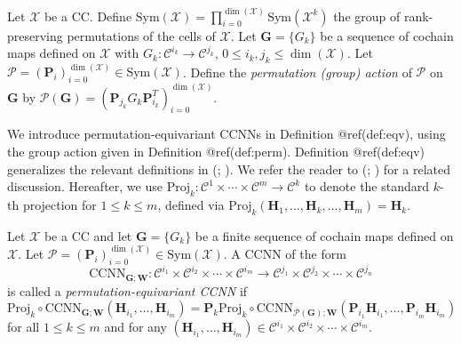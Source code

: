 \documentclass[
  12pt,
]{krantz}
\begin{document}
\label{perm}
Let \(\mathcal{X}\) be a CC. Define
\(\mbox{Sym}(\mathcal{X}) = \prod_{i=0}^{\dim(\mathcal{X})} \mbox{Sym}(\mathcal{X}^k)\)
the group of rank-preserving permutations of the cells of
\(\mathcal{X}\). Let \(\mathbf{G}=\{G_k\}\) be a sequence of cochain
maps defined on \(\mathcal{X}\) with
\(G_k  \colon \mathcal{C}^{i_k}\to \mathcal{C}^{j_k}\),
\(0\leq i_k,j_k\leq \dim(\mathcal{X})\). Let
\(\mathcal{P}=(\mathbf{P}_i)_{i=0}^{\dim(\mathcal{X})} \in \mbox{Sym}(\mathcal{X})\).
Define the \emph{permutation (group) action} of \(\mathcal{P}\) on
\(\mathbf{G}\) by
\(\mathcal{P}(\mathbf{G}) = (\mathbf{P}_{j_k} G_{k} \mathbf{P}_{i_k}^T )_{i=0}^{\dim(\mathcal{X})}\).

We introduce permutation-equivariant CCNNs in Definition @ref(def:eqv),
using the group action given in Definition @ref(def:perm). Definition
@ref(def:eqv) generalizes the relevant definitions in
(; ). We refer the reader to (;
) for a related
discussion. Hereafter, we use
\(\mbox{Proj}_k \colon \mathcal{C}^1\times \cdots \times \mathcal{C}^m \to \mathcal{C}^k\)
to denote the standard \(k\)-th projection for \(1\leq k \leq m\),
defined via
\(\mbox{Proj}_k ( \mathbf{H}_{1},\ldots, \mathbf{H}_{k},\ldots,\mathbf{H}_{m})= \mathbf{H}_{k}\).

\label{eqv}
Let \(\mathcal{X}\) be a CC and let \(\mathbf{G}= \{G_k\}\) be a finite
sequence of cochain maps defined on \(\mathcal{X}\). Let
\(\mathcal{P}=(\mathbf{P}_i)_{i=0}^{\dim(\mathcal{X})} \in \mbox{Sym}(\mathcal{X})\).
A CCNN of the form \begin{equation*}
\mbox{CCNN}_{\mathbf{G};\mathbf{W}}\colon \mathcal{C}^{i_1}\times\mathcal{C}^{i_2}\times \cdots \times  \mathcal{C}^{i_m} \to \mathcal{C}^{j_1}\times\mathcal{C}^{j_2}\times \cdots \times \mathcal{C}^{j_n}
\end{equation*} is called a \emph{permutation-equivariant CCNN} if
\begin{equation}
\mbox{Proj}_k \circ \mbox{CCNN}_{\mathbf{G};\mathbf{W}}(\mathbf{H}_{i_1},\ldots ,\mathbf{H}_{i_m})=
\mathbf{P}_{k} \mbox{Proj}_k \circ
\mbox{CCNN}_{\mathcal{P}(\mathbf{G});\mathbf{W}}(\mathbf{P}_{i_1} \mathbf{H}_{i_1}, \ldots ,\mathbf{P}_{i_m} \mathbf{H}_{i_m})
\end{equation} for all \(1 \leq k\leq m\) and for any
\((\mathbf{H}_{i_1},\ldots ,\mathbf{H}_{i_m}) \in\mathcal{C}^{i_1}\times\mathcal{C}^{i_2}\times \cdots \times  \mathcal{C}^{i_m}\).
\end{document}
